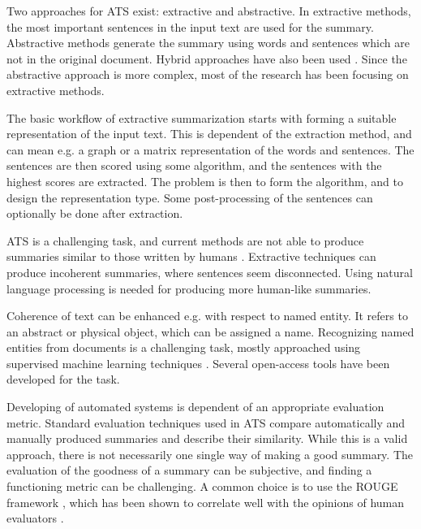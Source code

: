 \documentclass[conference]{IEEEtran}
\begin{document}

Two approaches for ATS exist: extractive and abstractive. In extractive methods, the most important sentences in the input text are used for the summary. Abstractive methods generate the summary using words and sentences which are not in the original document. 
Hybrid approaches have also been used \cite{el-kassas2020}. Since the abstractive approach is more complex, most of the research has been focusing on extractive methods.

The basic workflow of extractive summarization starts with forming a suitable representation of the input text. This is dependent of the extraction method, and can mean e.g. a graph or a matrix representation of the words and sentences. The sentences are then scored using some algorithm, and the sentences with the highest scores are extracted. The problem is then to form the algorithm, and to design the representation type. Some post-processing of the sentences can optionally be done after extraction.

ATS is a challenging task, and current methods are not able to produce summaries similar to those written by humans \cite{el-kassas2020}. Extractive techniques can produce incoherent summaries, where sentences seem disconnected. Using natural language processing is needed for producing more human-like summaries.

Coherence of text can be enhanced e.g. with respect to named entity. It refers to an abstract or physical object, which can be assigned a name. Recognizing named entities from documents is a challenging task, mostly approached using supervised machine learning techniques \cite{jiang2016}. Several open-access tools have been developed for the task.

Developing of automated systems is dependent of an appropriate evaluation metric. Standard evaluation techniques used in ATS compare automatically and manually produced summaries and describe their similarity. While this is a valid approach, there is not necessarily one single way of making a good summary. The evaluation of the goodness of a summary can be subjective, and finding a functioning metric can be challenging. A common choice is to use the ROUGE framework \cite{lin2004}, which has been shown to correlate well with the opinions of human evaluators \cite{sun2016}.
\end{document}

